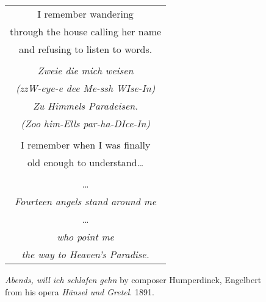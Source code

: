 \documentclass{article}
\begin{document}
\begin{center}
\begin{tabular}{c}
\\
I remember wandering \\
through the house calling her name \\
and refusing to listen to words. \\
\\
\textit{Zweie die mich weisen} \\
{\scriptsize\textit{(zzW-eye-e dee Me-ssh WIse-In)}} \\
\textit{Zu Himmels Paradeisen.} \\
{\scriptsize\textit{(Zoo him-Ells par-ha-DIce-In)}} \\
\\
I remember when I was finally \\
old enough to understand\ldots{} \\
\\
\ldots{} \\
\textit{Fourteen angels stand around me} \\
\ldots{} \\
\textit{who point me} \\
\textit{the way to Heaven's Paradise.}
\\
\end{tabular}
\end{center}
\vspace{3ex}
\textit{Abends, will ich schlafen gehn} by composer Humperdinck, Engelbert \\
from his opera \textit{H{\"a}nsel und Gretel}. 1891.
\end{document}
